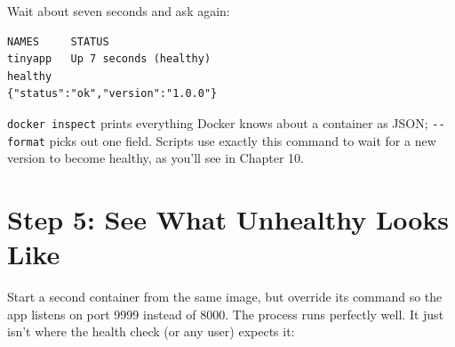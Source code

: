 
Wait about seven seconds and ask again:

\begin{codeblock}

\begin{Shaded}
\begin{Highlighting}[]
 
 
\end{Highlighting}
\end{Shaded}

\end{codeblock}

\begin{codeblock}
\begin{Verbatim}[formatcom=\outputstyle]
NAMES     STATUS
tinyapp   Up 7 seconds (healthy)
healthy
{"status":"ok","version":"1.0.0"}
\end{Verbatim}
\end{codeblock}

\texttt{docker\ inspect} prints everything Docker knows about a container as JSON; \texttt{-\/-format} picks out one field. Scripts use exactly this command to wait for a new version to become healthy, as you'll see in Chapter 10.

\section{Step 5: See What Unhealthy Looks Like}\label{09-lab-ship-a-small-python-app-in-a-container:step-5-see-what-unhealthy-looks-like}

Start a second container from the same image, but override its command so the app listens on port 9999 instead of 8000. The process runs perfectly well. It just isn't where the health check (or any user) expects it:

\begin{codeblock}

\begin{Shaded}
\begin{Highlighting}[]
 
\end{Highlighting}
\end{Shaded}

\end{codeblock}

